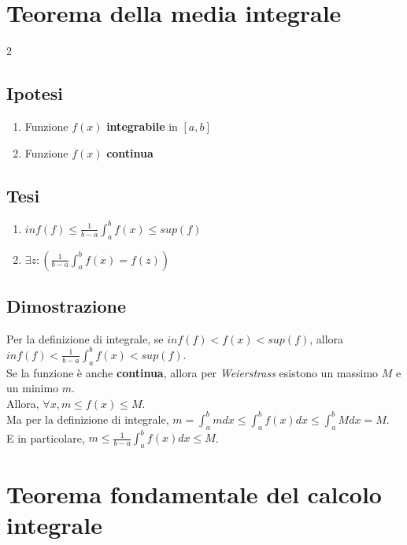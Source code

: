 \documentclass{article}
\begin{document}
\newpage

\section{Teorema della media integrale}

\begin{multicols}{2}
    \subsection{Ipotesi}
    \begin{enumerate}
        \item Funzione \(f(x)\) \textbf{integrabile} in \([a, b]\)
        \item Funzione \(f(x)\) \textbf{continua}
    \end{enumerate}
\columnbreak
    \subsection{Tesi}
    \begin{enumerate}
        \item \(inf(f) \leq \frac{1}{b - a} \int_a^b f(x) \leq sup(f) \)
        \item \(\exists z : (\frac{1}{b - a} \int_a^b f(x) = f(z))\)
    \end{enumerate}
\end{multicols}

\subsection{Dimostrazione}
Per la definizione di integrale, se \(inf(f) < f(x) < sup(f)\), allora \(inf(f) < \frac{1}{b - a} \int_a^b f(x) < sup(f) \).\\
Se la funzione è anche \textbf{continua}, allora per \textit{Weierstrass} esistono un massimo \(M\) e un minimo \(m\).\\
Allora, \(\forall x, m \leq f(x) \leq M\).\\
Ma per la definizione di integrale, \(m = \int_a^b m dx \leq \int_a^b f(x) dx \leq \int_a^b M dx = M \).\\
E in particolare, \(m \leq \frac{1}{b - a} \int_a^b f(x) dx \leq M\).

\newpage

\section{Teorema fondamentale del calcolo integrale}
\end{document}
